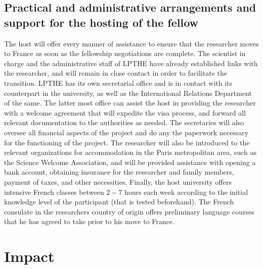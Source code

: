 \documentclass[a4paper,11pt,color]{article}
\begin{document}
\subsection{Practical and administrative arrangements and support for
  the hosting of the fellow}
\label{sec:impl_practical}

 { The host will offer every manner of assistance to ensure that the researcher moves to France as soon as the fellowship negotiations are complete. The scientist in charge and the administrative staff of LPTHE have already established links with the researcher, and will remain in close contact in order to facilitate the transition. 
LPTHE has its own secretarial office and is in contact with its counterpart in the university, as well as the International
Relations Department of the same. The latter most office can assist the host in providing the researcher with a welcome agreement that will expedite the visa process, and forward all relevant documentation to the authorities as needed. The secretaries will also oversee all financial aspects of the project and do any the paperwork necessary for the functioning of the project. The researcher will also be introduced to the relevant organizations for accommodation in the Paris metropolitan area, such as the Science Welcome Association, and will be provided assistance with opening a bank account, obtaining insurance for the researcher and family members, payment of taxes, and other necessities. Finally, the host university offers intensive French classes between $2-7$ hours each week according to the initial knowledge level of the participant (that is tested beforehand). The French consulate in the researchers country of origin offers preliminary language courses that he has agreed to take prior to his move to 
France.}

\newpage
\section{Impact}
\label{sec:impact}
\end{document}
